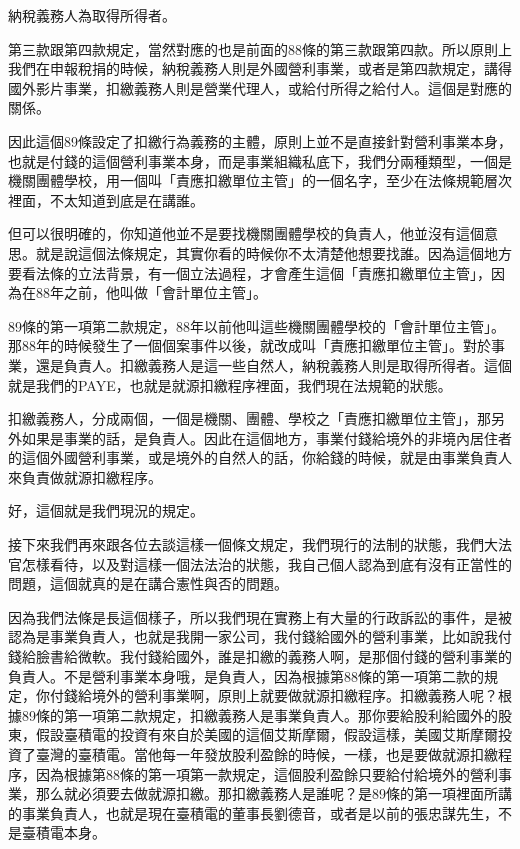 \documentclass[]{ctexbook}
\begin{document}
納稅義務人為取得所得者。

第三款跟第四款規定，當然對應的也是前面的88條的第三款跟第四款。所以原則上我們在申報稅捐的時候，納稅義務人則是外國營利事業，或者是第四款規定，講得國外影片事業，扣繳義務人則是營業代理人，或給付所得之給付人。這個是對應的關係。

因此這個89條設定了扣繳行為義務的主體，原則上並不是直接針對營利事業本身，也就是付錢的這個營利事業本身，而是事業組織私底下，我們分兩種類型，一個是機關團體學校，用一個叫「責應扣繳單位主管」的一個名字，至少在法條規範層次裡面，不太知道到底是在講誰。

但可以很明確的，你知道他並不是要找機關團體學校的負責人，他並沒有這個意思。就是說這個法條規定，其實你看的時候你不太清楚他想要找誰。因為這個地方要看法條的立法背景，有一個立法過程，才會產生這個「責應扣繳單位主管」，因為在88年之前，他叫做「會計單位主管」。

89條的第一項第二款規定，88年以前他叫這些機關團體學校的「會計單位主管」。那88年的時候發生了一個個案事件以後，就改成叫「責應扣繳單位主管」。對於事業，還是負責人。扣繳義務人是這一些自然人，納稅義務人則是取得所得者。這個就是我們的PAYE，也就是就源扣繳程序裡面，我們現在法規範的狀態。

扣繳義務人，分成兩個，一個是機關、團體、學校之「責應扣繳單位主管」，那另外如果是事業的話，是負責人。因此在這個地方，事業付錢給境外的非境內居住者的這個外國營利事業，或是境外的自然人的話，你給錢的時候，就是由事業負責人來負責做就源扣繳程序。

好，這個就是我們現況的規定。

接下來我們再來跟各位去談這樣一個條文規定，我們現行的法制的狀態，我們大法官怎樣看待，以及對這樣一個法法治的狀態，我自己個人認為到底有沒有正當性的問題，這個就真的是在講合憲性與否的問題。

因為我們法條是長這個樣子，所以我們現在實務上有大量的行政訴訟的事件，是被認為是事業負責人，也就是我開一家公司，我付錢給國外的營利事業，比如說我付錢給臉書給微軟。我付錢給國外，誰是扣繳的義務人啊，是那個付錢的營利事業的負責人。不是營利事業本身哦，是負責人，因為根據第88條的第一項第二款的規定，你付錢給境外的營利事業啊，原則上就要做就源扣繳程序。扣繳義務人呢？根據89條的第一項第二款規定，扣繳義務人是事業負責人。那你要給股利給國外的股東，假設臺積電的投資有來自於美國的這個艾斯摩爾，假設這樣，美國艾斯摩爾投資了臺灣的臺積電。當他每一年發放股利盈餘的時候，一樣，也是要做就源扣繳程序，因為根據第88條的第一項第一款規定，這個股利盈餘只要給付給境外的營利事業，那么就必須要去做就源扣繳。那扣繳義務人是誰呢？是89條的第一項裡面所講的事業負責人，也就是現在臺積電的董事長劉德音，或者是以前的張忠謀先生，不是臺積電本身。
\end{document}
